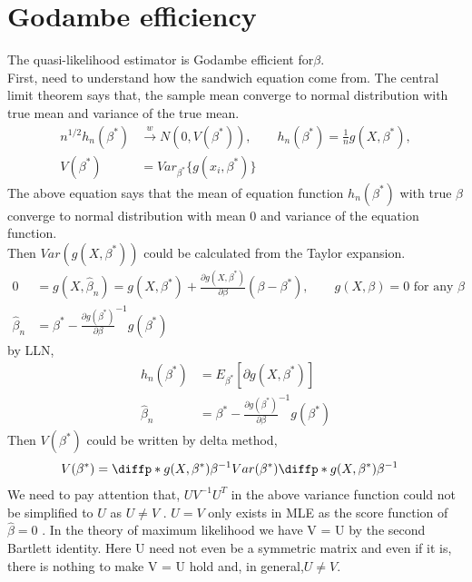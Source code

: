 

 \section{Godambe efficiency}
The quasi-likelihood estimator is Godambe efficient for$\beta$.\\
First, need to understand how the sandwich equation come from. The central limit theorem says that, the sample mean converge to normal distribution with true mean and variance of the true mean. 
\begin{align*}
   n^{1/2} h_n(\beta^{\ast}) & \xrightarrow{w} N (0, V(\beta^{\ast})), \qquad h_n(\beta^{\ast}) = \frac{1}{n} g(X, \beta^{\ast}), \\
   V(\beta^{\ast}) &=   Var_{\beta^{\ast}}\{ g(x_i, \beta^{\ast})\}
\end{align*} 
The above equation says that the mean of equation function $h_n(\beta^{\ast})$ with true $\beta$ converge to normal distribution with mean 0 and variance of the equation function.\\
Then $Var(g(X, \beta^{\ast}))$ could be calculated from the Taylor expansion.
\begin{align*}
 0 &= g(X, \hat{\beta}_n) = g(X,\beta^{\ast}) + \frac{\partial g(X, \beta^{\ast})}{\partial \beta} (\beta - \beta^{\ast}), \qquad g(X, \beta) = 0 \text{ for any }\beta\\
 \hat{\beta}_n &=  \beta^{\ast} - \frac{\partial g(\beta^{\ast})}{\partial \beta}^{-1} g(\beta^{\ast})
\end{align*}
 by LLN,
 \begin{align*}
 h_n(\beta^{\ast}) &= E_{\beta^{\ast}} [\partial g(X, \beta^{\ast})]\\
 \hat{\beta}_n &=  \beta^{\ast} - \frac{\partial g(\beta^{\ast})}{\partial \beta}^{-1} g(\beta^{\ast})
\end{align*}
 Then $V(\beta^{\ast})$ could be written by delta method,
 \begin{align*}
 V(\beta^{\ast}) &= \diffp*{g(X, \beta^{\ast})}{\beta}{}^{-1} Var(\beta^{\ast}) \diffp*{g(X, \beta^{\ast})}{\beta}{}^{-1}
\end{align*}
We need to pay attention that, $UV^{-1}U^T$ in the above variance function could not be simplified to $U$ as $U \neq V$ .
$U=V$ only exists in MLE as the score function of $\hat{\beta} = 0$ . In the theory of maximum likelihood we have V = U by the second Bartlett identity. Here U need not even be a symmetric matrix and even if it is, there is nothing to make V = U hold and, in general,$U \neq V$.\\

